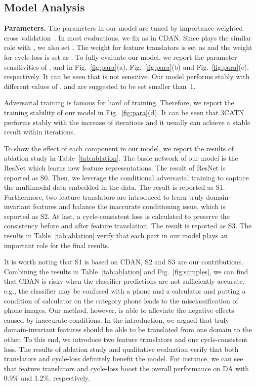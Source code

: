\documentclass[sigconf]{acmart}
\begin{document}
\subsection{Model Analysis}
{\bf Parameters.} The parameters in our model are tuned by importance weighted cross validation~\cite{sugiyama2007covariate}. In most evaluations, we fix  as in CDAN. Since  plays the similar role with , we also set . The weight for feature translators  is set as  and the weight for cycle-loss  is set as . To fully evaluate our model, we report the parameter sensitivities of ,  and  in Fig.~\ref{fig:para}(a), Fig.~\ref{fig:para}(b) and Fig.~\ref{fig:para}(c), respectively. It can be seen that  is not sensitive. Our model performs stably with different values of .  and  are suggested to be set smaller than~1.

 Adversarial training is famous for hard of training. Therefore, we report the training stability of our model in Fig.~\ref{fig:para}(d). It can be seen that 3CATN performs stably with the increase of iterations and it usually can achieve a stable result within  iterations.

 To show the effect of each component in our model, we report the results of ablation study in Table~\ref{tab:ablation}. The basic network of our model is the ResNet which learns new feature representations. The result of ResNet is reported as S0. Then, we leverage the conditional adversarial training to capture the multimodal data embedded in the data. The result is reported as S1. Furthermore, two feature translators are introduced to learn truly domain-invariant features and balance the inaccurate conditioning issue, which is reported as S2. At last, a cycle-consistent loss is calculated to preserve the consistency before and after feature translation. The result is reported as S3. The results in Table~\ref{tab:ablation} verify that each part in our model plays an important role for the final results. 

It is worth noting that S1 is based on CDAN, S2 and S3 are our contributions. Combining the results in Table~\ref{tab:ablation} and Fig.~\ref{fig:samples}, we can find that CDAN is risky when the classifier predictions are not sufficiently accurate, e.g., the classifier may be confused with a phone and a calculator and putting a condition of calculator on the category phone leads to the misclassification of phone images. Our method, however, is able to alleviate the negative effects caused by inaccurate conditions. In the introduction, we argued that truly domain-invariant features should be able to be translated from one domain to the other. To this end, we introduce two feature translators and one cycle-consistent loss. The results of ablation study and qualitative evaluation verify that both translators and cycle-loss definitely benefit the model. For instance, we can see that feature translators and cycle-loss boost the overall performance on DA with 0.9\% and 1.2\%, respectively.
\end{document}
